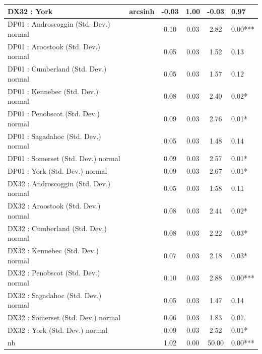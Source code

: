 \begin{table}
\begin{center}
\begin{tabular}{|l|l|c|c|c|l|}
			\hline
			DX32 : York & arcsinh & -0.03 & 1.00 & -0.03 & 0.97 \\
			\hline
			DP01 : Androscoggin (Std. Dev.) normal &  & 0.10 & 0.03 & 2.82 & 0.00*** \\
			\hline
			DP01 : Aroostook (Std. Dev.) normal &  & 0.05 & 0.03 & 1.52 & 0.13 \\
			\hline
			DP01 : Cumberland (Std. Dev.) normal &  & 0.05 & 0.03 & 1.57 & 0.12 \\
			\hline
			DP01 : Kennebec (Std. Dev.) normal &  & 0.08 & 0.03 & 2.40 & 0.02* \\
			\hline
			DP01 : Penobscot (Std. Dev.) normal &  & 0.09 & 0.03 & 2.76 & 0.01* \\
			\hline
			DP01 : Sagadahoc (Std. Dev.) normal &  & 0.05 & 0.03 & 1.48 & 0.14 \\
			\hline
			DP01 : Somerset (Std. Dev.) normal &  & 0.09 & 0.03 & 2.57 & 0.01* \\
			\hline
			DP01 : York (Std. Dev.) normal &  & 0.09 & 0.03 & 2.67 & 0.01* \\
			\hline
			DX32 : Androscoggin (Std. Dev.) normal &  & 0.05 & 0.03 & 1.58 & 0.11 \\
			\hline
			DX32 : Aroostook (Std. Dev.) normal &  & 0.08 & 0.03 & 2.44 & 0.02* \\
			\hline
			DX32 : Cumberland (Std. Dev.) normal &  & 0.08 & 0.03 & 2.22 & 0.03* \\
			\hline
			DX32 : Kennebec (Std. Dev.) normal &  & 0.07 & 0.03 & 2.18 & 0.03* \\
			\hline
			DX32 : Penobscot (Std. Dev.) normal &  & 0.10 & 0.03 & 2.88 & 0.00*** \\
			\hline
			DX32 : Sagadahoc (Std. Dev.) normal &  & 0.05 & 0.03 & 1.47 & 0.14 \\
			\hline
			DX32 : Somerset (Std. Dev.) normal &  & 0.06 & 0.03 & 1.83 & 0.07. \\
			\hline
			DX32 : York (Std. Dev.) normal &  & 0.09 & 0.03 & 2.52 & 0.01* \\
			\hline
			nb &  & 1.02 & 0.00 & 50.00 & 0.00*** \\
			\hline
		\end{tabular}
	\end{center}
\end{table}